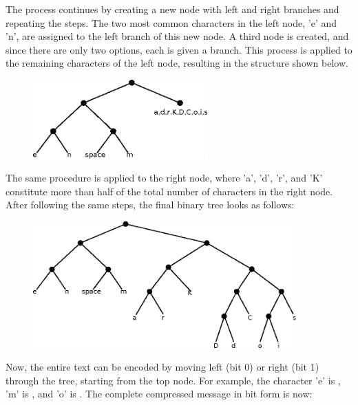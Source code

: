 \documentclass[book.tex]{subfiles}
\begin{document}
 \par
The process continues by creating a new node with left and right branches and repeating the steps. The two most common characters in the left node, 'e' and 'n', are assigned to the left branch of this new node. A third node is created, and since there are only two options, each is given a branch. This process is applied to the remaining characters of the left node, resulting in the structure shown below. \\

\begin{figure}[H]
\centering
 \includegraphics[width=0.6\textwidth]{imgs/drawings/huffman_tree_2.eps}
 \end{figure}

 \par
The same procedure is applied to the right node, where 'a', 'd', 'r', and 'K' constitute more than half of the total number of characters in the right node. After following the same steps, the final binary tree looks as follows:\\
 
\begin{figure}[H]
\centering
 \includegraphics[width=0.9\textwidth]{imgs/drawings/huffman_tree_3.eps}
 \end{figure}

 \par
Now, the entire text can be encoded by moving left (bit 0) or right (bit 1) through the tree, starting from the top node. For example, the character 'e' is , 'm' is , and 'o' is . The complete compressed message in bit form is now:\\
\end{document}
